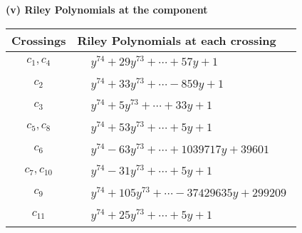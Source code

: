 \documentclass[1p]{elsarticle_modified}
\theoremstyle{definition}
\begin{document}
\newpage\renewcommand{\arraystretch}{1}
\flushleft \textbf{(v) Riley Polynomials at the component}\newline \\
\begin{tabular}{m{50pt}|m{274pt}}
Crossings & \hspace{64pt}Riley Polynomials at each crossing \\
\hline $$\begin{aligned}c_{1},c_{4}\end{aligned}$$&$\begin{aligned}
&y^{74}+29 y^{73}+\cdots+57 y+1
\end{aligned}$\\
\hline $$\begin{aligned}c_{2}\end{aligned}$$&$\begin{aligned}
&y^{74}+33 y^{73}+\cdots-859 y+1
\end{aligned}$\\
\hline $$\begin{aligned}c_{3}\end{aligned}$$&$\begin{aligned}
&y^{74}+5 y^{73}+\cdots+33 y+1
\end{aligned}$\\
\hline $$\begin{aligned}c_{5},c_{8}\end{aligned}$$&$\begin{aligned}
&y^{74}+53 y^{73}+\cdots+5 y+1
\end{aligned}$\\
\hline $$\begin{aligned}c_{6}\end{aligned}$$&$\begin{aligned}
&y^{74}-63 y^{73}+\cdots+1039717 y+39601
\end{aligned}$\\
\hline $$\begin{aligned}c_{7},c_{10}\end{aligned}$$&$\begin{aligned}
&y^{74}-31 y^{73}+\cdots+5 y+1
\end{aligned}$\\
\hline $$\begin{aligned}c_{9}\end{aligned}$$&$\begin{aligned}
&y^{74}+105 y^{73}+\cdots-37429635 y+299209
\end{aligned}$\\
\hline $$\begin{aligned}c_{11}\end{aligned}$$&$\begin{aligned}
&y^{74}+25 y^{73}+\cdots+5 y+1
\end{aligned}$\\
\hline
\end{tabular}\\~\\
\end{document}
